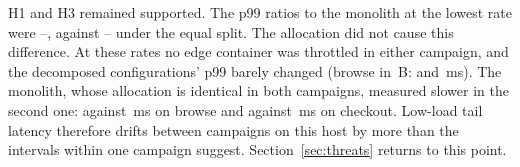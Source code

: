 H1 and H3 remained supported. The p99 ratios to the monolith at the lowest rate were
--, against
-- under the equal split. The allocation did not cause this
difference. At these rates no edge container was throttled in either campaign, and the decomposed configurations'
p99 barely changed (browse in~B:  and \,ms). The monolith, whose
allocation is identical in both campaigns, measured slower in the second one:  against
\,ms on browse and  against \,ms on
checkout. Low-load tail latency therefore drifts between campaigns on this host by more than the intervals within
one campaign suggest. Section~\ref{sec:threats} returns to this point.
